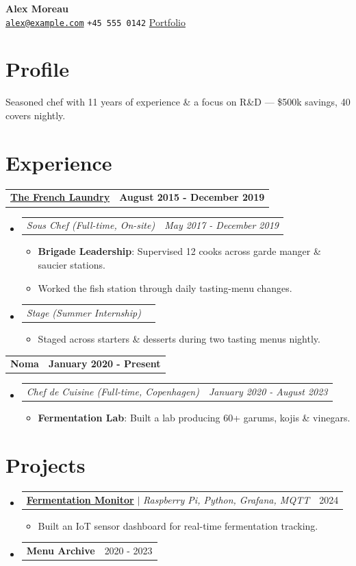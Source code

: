 \documentclass[letterpaper,10.8pt]{article}
\makeatletter
\newcommand{\resumeItem}[2]{
  \item\small{
    \textbf{#1}{: #2 \vspace{-2pt}}
  }
}
\newcommand{\resumeItemWithoutTitle}[1]{
  \item\small{#1 \vspace{-2pt}}
}
\newcommand{\jobLineItem}[2]{
  \vspace{0pt}\item[]
    \begin{tabular*}{0.98\textwidth}{l@{\extracolsep{\fill}}r}
      \textit{#1} & \textit{\small #2} \\
    \end{tabular*}\vspace{-4pt}
}
\newcommand{\resumeProjectHeading}[2]{
  \item
    \begin{tabular*}{0.97\textwidth}{l@{\extracolsep{\fill}}r}
      \small#1 & #2 \\
    \end{tabular*}\vspace{-7pt}
}
\newcommand{\employerTitle}[3]{
  \begin{tabular*}{1\textwidth}{l@{\extracolsep{\fill}}r}
    \href{#1}{\textbf{#2}} & \textbf{#3} \\
  \end{tabular*}\vspace{-16.6pt}
}
\newcommand{\employerTitlePlain}[2]{
  \begin{tabular*}{1\textwidth}{l@{\extracolsep{\fill}}r}
    \textbf{#1} & \textbf{#2} \\
  \end{tabular*}\vspace{-16.6pt}
}
\newcommand{\resumeSubHeadingListStart}{\begin{itemize}[leftmargin=*]}
\newcommand{\resumeSubHeadingListEnd}{\end{itemize}}
\newcommand{\resumeItemListStart}{\begin{itemize}}
\newcommand{\resumeItemListEnd}{\end{itemize}\vspace{-5pt}}
\makeatother
\begin{document}
\textbf{\LARGE {Alex Moreau}}\\
\texttt{\href{mailto:alex@example.com}{alex@example.com}} \texttt{+45 555 0142} \href{https://alexmoreau.example.com}{Portfolio}\\

\section{Profile}

Seasoned chef with 11 years of experience \& a focus on R\&D --- \$500k savings, 40 covers nightly.

\section{Experience}

\employerTitle{https://www.thomaskeller.com/tfl}{The French Laundry}{August 2015 - December 2019}
\resumeSubHeadingListStart
  \jobLineItem{Sous Chef (Full-time, On-site)}{May 2017 - December 2019}
  \resumeItemListStart
    \resumeItem{Brigade Leadership}{Supervised 12 cooks across garde manger \& saucier stations.}
    \resumeItemWithoutTitle{Worked the fish station through daily tasting-menu changes.}
  \resumeItemListEnd
  \jobLineItem{Stage (Summer Internship)}{}
  \resumeItemListStart
    \resumeItemWithoutTitle{Staged across starters \& desserts during two tasting menus nightly.}
  \resumeItemListEnd
\resumeSubHeadingListEnd
\vspace{4pt}

\employerTitlePlain{Noma}{January 2020 - Present}
\resumeSubHeadingListStart
  \jobLineItem{Chef de Cuisine (Full-time, Copenhagen)}{January 2020 - August 2023}
  \resumeItemListStart
    \resumeItem{Fermentation Lab}{Built a lab producing 60+ garums, kojis \& vinegars.}
  \resumeItemListEnd
\resumeSubHeadingListEnd

\section{Projects}

\resumeSubHeadingListStart
  \resumeProjectHeading{\href{https://github.com/alexmoreau/fermentation-monitor}{\textbf{Fermentation Monitor}} $|$ \emph{Raspberry Pi, Python, Grafana, MQTT}}{2024}
  \resumeItemListStart
    \resumeItemWithoutTitle{Built an IoT sensor dashboard for real-time fermentation tracking.}
  \resumeItemListEnd
  \resumeProjectHeading{\textbf{Menu Archive}}{2020 - 2023}
\resumeSubHeadingListEnd
\end{document}
